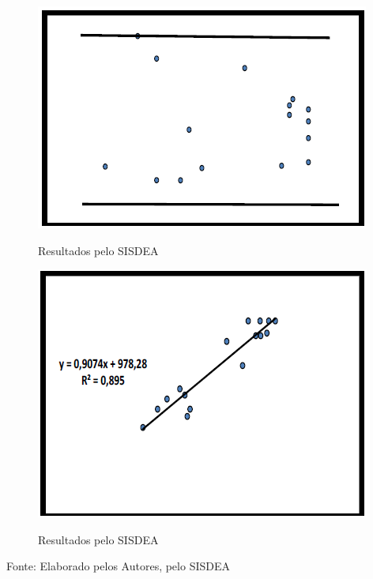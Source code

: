 \begin{minipage}[t!]{0.5\textwidth}
	\begin{figure}[H]
		\centering  \small 		\caption{ Resultados pelo SISDEA}
		\includegraphics[width=0.9347\linewidth]{figura/screenshot030}
		\label{fig:screenshot030}
	\end{figure}
	
\end{minipage}\hfill
\begin{minipage}[t!]{0.5\textwidth}
	\begin{figure}[H]
		\centering  \small 		\caption{ Resultados pelo SISDEA}
		\includegraphics[width=0.9347\linewidth]{figura/screenshot031}
		\label{fig:screenshot031}
	\end{figure}
\end{minipage} 
\begin{center}
	Fonte: Elaborado pelos Autores, pelo SISDEA
\end{center}

